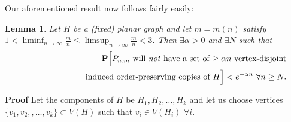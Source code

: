 \documentclass{article}
\newtheorem{Lemma}[Theorem]{Lemma}
\newtheorem{Proof of Theorem}{Proof of Theorem}
\begin{document}
Our aforementioned result now follows fairly easily:














\begin{Lemma} \label{sub3}
Let $H$ be a (fixed) planar graph and let $m=m(n)$ satisfy \\
$1 < \liminf_{n \to \infty} \frac{m}{n} \leq \limsup_{n \to \infty} \frac{m}{n} < 3$.
Then $\exists \alpha > 0$ and $\exists N$ such that
\begin{eqnarray*}
& & \mathbf{P}\Big[\textrm{$P_{n,m}$
will \emph{not} have a set of $\geq \alpha n$ vertex-disjoint} \\
& & \phantom{wwwwwwwwi}\textrm{induced order-preserving copies of $H$}\Big] 
< e^{- \alpha n} 
\textrm{ } \forall n \geq N.
\end{eqnarray*}
\end{Lemma}
\textbf{Proof}
Let the components of $H$ be $H_{1}, H_{2}, \ldots, H_{k}$
and let us choose vertices
$\{ v_{1}, v_{2}, , \ldots, v_{k} \} \subset V(H)$
such that $v_{i} \in V(H_{i})$ $\forall i$.
\end{document}
